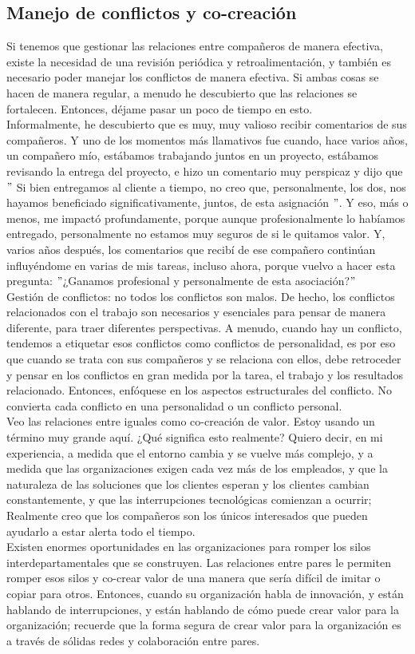 \documentclass[10pt]{book}
\begin{document}
\subsection{Manejo de conflictos y co-creación}
Si tenemos que gestionar las relaciones entre compañeros de manera efectiva, existe la necesidad de una revisión periódica y retroalimentación, y también es necesario poder manejar los conflictos de manera efectiva. Si ambas cosas se hacen de manera regular, a menudo he descubierto que las relaciones se fortalecen. Entonces, déjame pasar un poco de tiempo en esto.\\
Informalmente, he descubierto que es muy, muy valioso recibir comentarios de sus compañeros. Y uno de los momentos más llamativos fue cuando, hace varios años, un compañero mío, estábamos trabajando juntos en un proyecto, estábamos revisando la entrega del proyecto, e hizo un comentario muy perspicaz y dijo que $"$ Si bien entregamos al cliente a tiempo, no creo que, personalmente, los dos, nos hayamos beneficiado significativamente, juntos, de esta asignación $"$. Y eso, más o menos, me impactó profundamente, porque aunque profesionalmente lo habíamos entregado, personalmente no estamos muy seguros de si le quitamos valor. Y, varios años después, los comentarios que recibí de ese compañero continúan influyéndome en varias de mis tareas, incluso ahora, porque vuelvo a hacer esta pregunta: $"$¿Ganamos profesional y personalmente de esta asociación?$"$\\
Gestión de conflictos: no todos los conflictos son malos. De hecho, los conflictos relacionados con el trabajo son necesarios y esenciales para pensar de manera diferente, para traer diferentes perspectivas. A menudo, cuando hay un conflicto, tendemos a etiquetar esos conflictos como conflictos de personalidad, es por eso que cuando se trata con sus compañeros y se relaciona con ellos, debe retroceder y pensar en los conflictos en gran medida por la tarea, el trabajo y los resultados relacionado. Entonces, enfóquese en los aspectos estructurales del conflicto. No convierta cada conflicto en una personalidad o un conflicto personal.\\
Veo las relaciones entre iguales como co-creación de valor. Estoy usando un término muy grande aquí. ¿Qué significa esto realmente? Quiero decir, en mi experiencia, a medida que el entorno cambia y se vuelve más complejo, y a medida que las organizaciones exigen cada vez más de los empleados, y que la naturaleza de las soluciones que los clientes esperan y los clientes cambian constantemente, y que las interrupciones tecnológicas comienzan a ocurrir; Realmente creo que los compañeros son los únicos interesados que pueden ayudarlo a estar alerta todo el tiempo.\\
Existen enormes oportunidades en las organizaciones para romper los silos interdepartamentales que se construyen. Las relaciones entre pares le permiten romper esos silos y co-crear valor de una manera que sería difícil de imitar o copiar para otros. Entonces, cuando su organización habla de innovación, y están hablando de interrupciones, y están hablando de cómo puede crear valor para la organización; recuerde que la forma segura de crear valor para la organización es a través de sólidas redes y colaboración entre pares.
\end{document}
